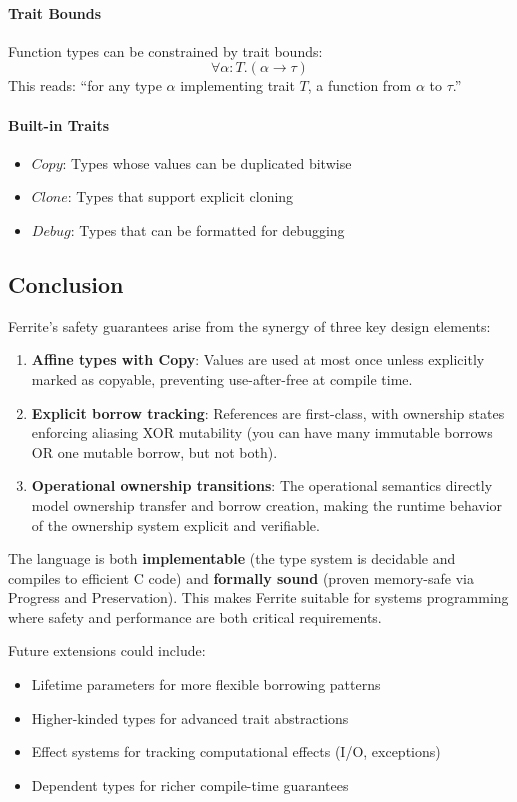 \documentclass[11pt,a4paper,twoside]{book}
\begin{document}
\paragraph{Trait Bounds}
Function types can be constrained by trait bounds:
\[
\forall \alpha : T . (\alpha \rightarrow \tau)
\]
This reads: ``for any type $\alpha$ implementing trait $T$, a function from
$\alpha$ to $\tau$.''

\paragraph{Built-in Traits}
\begin{itemize}
  \item $\mathit{Copy}$: Types whose values can be duplicated bitwise
  \item $\mathit{Clone}$: Types that support explicit cloning
  \item $\mathit{Debug}$: Types that can be formatted for debugging
\end{itemize}


\subsection{Conclusion}

Ferrite's safety guarantees arise from the synergy of three key design elements:

\begin{enumerate}
  \item \textbf{Affine types with Copy}: Values are used at most once unless
    explicitly marked as copyable, preventing use-after-free at compile time.
  
  \item \textbf{Explicit borrow tracking}: References are first-class, with
    ownership states enforcing aliasing XOR mutability (you can have many
    immutable borrows OR one mutable borrow, but not both).
  
  \item \textbf{Operational ownership transitions}: The operational semantics
    directly model ownership transfer and borrow creation, making the runtime
    behavior of the ownership system explicit and verifiable.
\end{enumerate}

The language is both \textbf{implementable} (the type system is decidable and
compiles to efficient C code) and \textbf{formally sound} (proven memory-safe via
Progress and Preservation). This makes Ferrite suitable for systems programming
where safety and performance are both critical requirements.

Future extensions could include:
\begin{itemize}
  \item Lifetime parameters for more flexible borrowing patterns
  \item Higher-kinded types for advanced trait abstractions
  \item Effect systems for tracking computational effects (I/O, exceptions)
  \item Dependent types for richer compile-time guarantees
\end{itemize}
\end{document}
